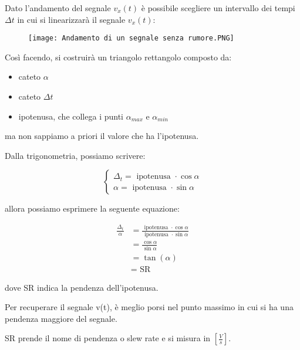 Dato l'andamento del segnale $v_x (t)$ è possibile scegliere un intervallo dei tempi $\Delta t$ in cui si linearizzarà il segnale $v_x (t)$: 

\begin{figure}[h]
    \centering
    \texttt{[image: Andamento di un segnale senza rumore.PNG]}
\end{figure}

Così facendo, si costruirà un triangolo rettangolo composto da: 

\begin{itemize}
    \item cateto $\alpha$ 
    \item cateto $\Delta t$
    \item ipotenusa, che collega i punti $\alpha_{max}$ e $\alpha_{min}$
\end{itemize}

ma non sappiamo a priori il valore che ha l'ipotenusa. \newline 

Dalla trigonometria, possiamo scrivere: 

{
    \Large
    \begin{equation}
        \begin{cases}
        \Delta_t = \text{ ipotenusa } \cdot \cos \alpha
        \\ 
        \alpha = \text{ ipotenusa } \cdot \sin \alpha     
        \end{cases}
    \end{equation}
}


allora possiamo esprimere la seguente equazione: 

{
    \Large 
    \begin{equation}
        \begin{split}
            \frac{\Delta_t}{\alpha}
            &= 
            \frac{\text{ ipotenusa } \cdot \cos \alpha}{\text{ ipotenusa } \cdot \sin \alpha  } 
            \\
            &=
            \frac{\cos \alpha}{\sin \alpha}
            \\
            &= 
            \tan(\alpha)
            \\
            &=
            \text{ SR}
        \end{split}
    \end{equation}
}

dove SR indica la pendenza dell'ipotenusa. \newline 

Per recuperare il segnale v(t), è meglio porsi nel punto massimo in cui si ha una pendenza maggiore del segnale. \newline 

SR prende il nome di pendenza o slew rate e si misura in $[\frac{V}{s}]$. \newline 

\newpage 
